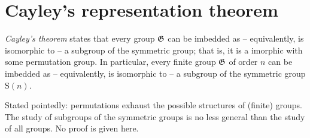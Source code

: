 \section{Cayley's representation theorem}
{\em Cayley's theorem} states that every group ${\frak G}$ can be imbedded as
--
equivalently, is isomorphic to -- a subgroup
of the symmetric group; that is, it is a imorphic with some permutation group.
In particular, every finite group ${\frak G}$ of order $n$  can be imbedded as
--
equivalently, is isomorphic to -- a subgroup
of the symmetric group $\textrm{S}(n)$.

Stated pointedly: permutations exhaust the possible structures of (finite) groups.
The study of subgroups of the symmetric groups is no less general than the study of all groups.
No proof is given here.






\begin{center}
{\color{olive}   \Huge
 \decosix
}
\end{center}
